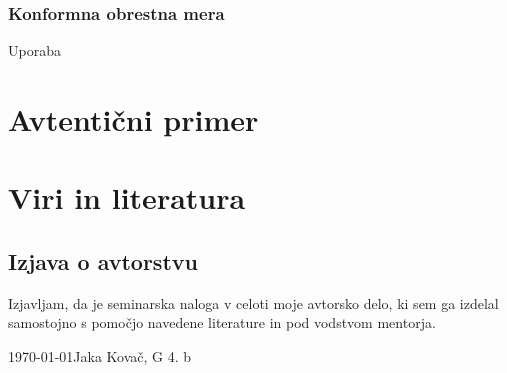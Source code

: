\documentclass[12pt]{article}
\begin{document}
        \subsubsection{Konformna obrestna mera}
        Uporaba 
\section{Avtentični primer}






\newpage
\begingroup
\makeatletter
    \section{Viri in literatura}
    \nocite{*}
    \printbibliography[heading=none]
\makeatother
\endgroup
\newpage

\begin{samepage}
    \thispagestyle{empty}
    \section*{Izjava o avtorstvu}
    Izjavljam, da je seminarska naloga v celoti moje avtorsko delo, ki sem ga 
    izdelal samostojno s pomočjo navedene literature in pod vodstvom mentorja.

    \vfill
    
    \today \hfill Jaka Kovač, G 4. b
    
    \vspace{3 cm}
\end{samepage}
\end{document}
